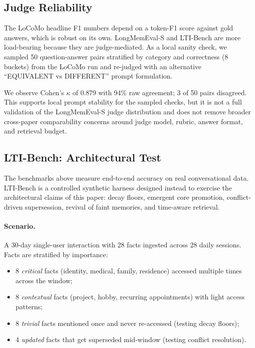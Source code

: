 \documentclass[11pt,a4paper]{article}
\begin{document}
\subsection{Judge Reliability}
\label{sec:eval-judge}

The LoCoMo headline F1 numbers depend on a token-F1 score against gold answers, which is robust on its own. LongMemEval-S and LTI-Bench are more load-bearing because they are judge-mediated. As a local sanity check, we sampled 50 question-answer pairs stratified by category and correctness (8 buckets) from the LoCoMo run and re-judged with an alternative ``EQUIVALENT vs DIFFERENT'' prompt formulation.

We observe Cohen's $\kappa$ of 0.879 with 94\% raw agreement; 3 of 50 pairs disagreed. This supports local prompt stability for the sampled checks, but it is not a full validation of the LongMemEval-S judge distribution and does not remove broader cross-paper comparability concerns around judge model, rubric, answer format, and retrieval budget.

\subsection{LTI-Bench: Architectural Test}
\label{sec:eval-lti}

The benchmarks above measure end-to-end accuracy on real conversational data. LTI-Bench is a controlled synthetic harness designed instead to exercise the architectural claims of this paper: decay floors, emergent core promotion, conflict-driven supersession, revival of faint memories, and time-aware retrieval.

\paragraph{Scenario.} A 30-day single-user interaction with 28 facts ingested across 28 daily sessions. Facts are stratified by importance:

\begin{itemize}
    \item 8 \emph{critical} facts (identity, medical, family, residence) accessed multiple times across the window;
    \item 8 \emph{contextual} facts (project, hobby, recurring appointments) with light access patterns;
    \item 8 \emph{trivial} facts mentioned once and never re-accessed (testing decay floors);
    \item 4 \emph{updated} facts that get superseded mid-window (testing conflict resolution).
\end{itemize}
\end{document}
